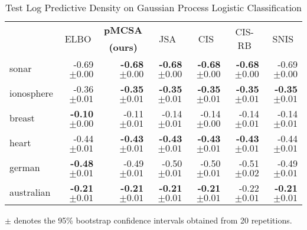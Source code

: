 
\begin{table*}
  \vspace{-0.2in}
  \centering
  \caption{Test Log Predictive Density on Gaussian Process Logistic Classification}\label{table:gp}
  \vspace{-0.05in}
  \setlength{\tabcolsep}{4pt}
  \begin{threeparttable}
  \begin{tabular}{lrrrrrr}
    \toprule
    & \multicolumn{1}{c}{\multirow{2}{*}{ELBO}} & \multicolumn{1}{c}{\multirow{1}{*}{\textbf{pMCSA}}} & \multicolumn{1}{c}{\multirow{2}{*}{JSA}} & \multicolumn{1}{c}{\multirow{2}{*}{CIS}} & \multicolumn{1}{c}{\multirow{2}{*}{CIS-RB}} & \multicolumn{1}{c}{\multirow{2}{*}{SNIS}} \\
    & & \multicolumn{1}{c}{\textbf{(ours)}} & & & & \\
    \midrule
    \textsf{sonar} & {-0.69 {\scriptsize{\(\pm 0.00\)}}} & {\bf-0.68 {\scriptsize{\(\pm 0.00\)}}} & {\bf-0.68 {\scriptsize{\(\pm 0.00\)}}} & {\bf-0.68 {\scriptsize{\(\pm 0.00\)}}} & {\bf-0.68 {\scriptsize{\(\pm 0.00\)}}} & {-0.69 {\scriptsize{\(\pm 0.00\)}}} \\
    \textsf{ionosphere} & {-0.36 {\scriptsize{\(\pm 0.01\)}}} & {\bf-0.35 {\scriptsize{\(\pm 0.01\)}}} & {\bf-0.35 {\scriptsize{\(\pm 0.01\)}}} & {\bf-0.35 {\scriptsize{\(\pm 0.01\)}}} & {\bf-0.35 {\scriptsize{\(\pm 0.01\)}}} & {\bf-0.35 {\scriptsize{\(\pm 0.01\)}}} \\
    \textsf{breast} & {\bf-0.10 {\scriptsize{\(\pm 0.00\)}}} & {-0.11 {\scriptsize{\(\pm 0.01\)}}} & {-0.14 {\scriptsize{\(\pm 0.01\)}}} & {-0.14 {\scriptsize{\(\pm 0.00\)}}} & {-0.14 {\scriptsize{\(\pm 0.01\)}}} & {-0.14 {\scriptsize{\(\pm 0.01\)}}} \\
    \textsf{heart} & {-0.44 {\scriptsize{\(\pm 0.01\)}}} & {\bf-0.43 {\scriptsize{\(\pm 0.01\)}}} & {\bf-0.43 {\scriptsize{\(\pm 0.01\)}}} & {\bf-0.43 {\scriptsize{\(\pm 0.01\)}}} & {\bf-0.43 {\scriptsize{\(\pm 0.01\)}}} & {-0.44 {\scriptsize{\(\pm 0.01\)}}} \\
    \textsf{german} & {\bf-0.48 {\scriptsize{\(\pm 0.01\)}}} & {-0.49 {\scriptsize{\(\pm 0.01\)}}} & {-0.50 {\scriptsize{\(\pm 0.01\)}}} & {-0.50 {\scriptsize{\(\pm 0.01\)}}} & {-0.51 {\scriptsize{\(\pm 0.02\)}}} & {-0.49 {\scriptsize{\(\pm 0.01\)}}} \\
    \textsf{australian} & {\bf-0.21 {\scriptsize{\(\pm 0.01\)}}} & {\bf-0.21 {\scriptsize{\(\pm 0.01\)}}} & {\bf-0.21 {\scriptsize{\(\pm 0.01\)}}} & {\bf-0.21 {\scriptsize{\(\pm 0.01\)}}} & {-0.22 {\scriptsize{\(\pm 0.01\)}}} & {\bf-0.21 {\scriptsize{\(\pm 0.01\)}}} \\\bottomrule
  \end{tabular}
  \begin{tablenotes}
    \item[]{\footnotesize \(\pm\) denotes the 95\% bootstrap confidence intervals obtained from 20 repetitions.}
  \end{tablenotes}
  \end{threeparttable}
  \vspace{-0.15in}
\end{table*}

